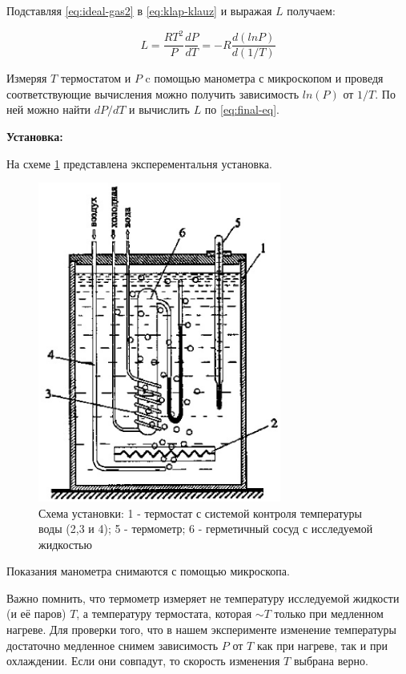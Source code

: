 \documentclass[a4paper,12pt]{article}
\begin{document}
Подставляя \ref{eq:ideal-gas2} в \ref{eq:klap-klauz} и выражая $L$ получаем:

\begin{equation}\label{eq:final-eq}
L = \frac{RT^2}{P}\frac{dP}{dT} = -R\frac{d(lnP)}{d(1/T)}
\end{equation}

Измеряя $T$ термостатом и $P$ c помощью манометра с микроскопом и проведя соответствующие вычисления можно получить зависимость $ln(P)$ от $1/T$. По ней можно найти $dP/dT$ и вычислить $L$ по \ref{eq:final-eq}.
\bigskip

\textbf{Установка:}
\medskip

На схеме \ref{schema} представлена эксперементальня установка. 

\begin{figure}[ht]
\centering
\includegraphics[width=80mm]{schema.eps}
\caption{Схема установки: 1 - термостат с системой контроля температуры воды (2,3 и 4); 5 - термометр; 6 - герметичный сосуд с исследуемой жидкостью}\label{schema}
\end{figure}

Показания манометра снимаются с помощью микроскопа.

Важно помнить, что термометр измеряет не температуру исследуемой жидкости (и её паров) $T$, а температуру термостата, которая  $\sim T$ только при медленном нагреве. Для проверки того, что в нашем эксперименте изменение температуры достаточно медленное снимем зависимость $P$ от $T$ как при нагреве, так и при охлаждении. Если они совпадут, то скорость изменения $T$ выбрана верно.
\bigskip
\end{document}
